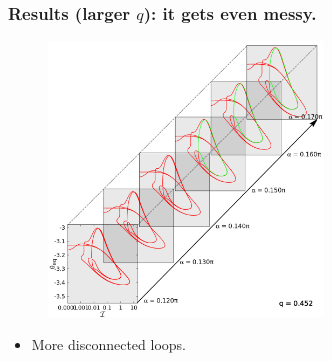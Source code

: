 \documentclass{beamer}
\newcommand{\bi}{\begin{itemize}}
\newcommand{\ei}{\end{itemize}}
\begin{document}




\begin{frame}
	\frametitle{Results (larger $q$): it gets even messy.}
	\begin{overlayarea}{\textwidth}{\textheight}\vspace{-0.3cm}
		\begin{figure}[htb]
			\begin{center}
				\includegraphics[width=0.65\textwidth]{plots/elastic_beam_I_theta_q_0.452_alpha_restart1.png}
			\end{center}
		\end{figure}\vspace{-0.3cm}
	\bi
	\item More disconnected loops.
	\ei 
	\end{overlayarea}
\end{frame}

\end{document}
